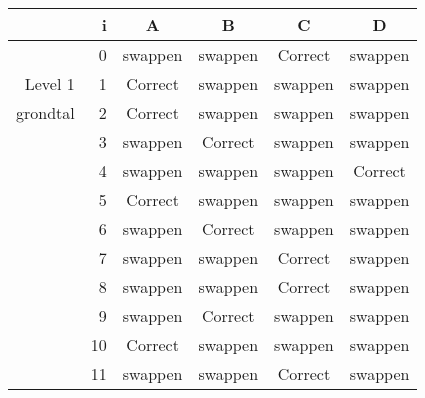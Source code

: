 \begin{tabular}{ rr| c|c|c|c}\hline\hline
     & i & \textbf{A} & \textbf{B} & \textbf{C} & \textbf{D}\\\hline

&0&swappen&swappen&Correct\cellcolor[gray]{0.6}&swappen\\
Level 1 & 1&Correct\cellcolor[gray]{0.6}&swappen&swappen&swappen\\
grondtal &2&Correct\cellcolor[gray]{0.6}&swappen&swappen&swappen\\
&3&swappen&Correct\cellcolor[gray]{0.6}&swappen&swappen\\
&4&swappen&swappen&swappen&Correct\cellcolor[gray]{0.6}\\
&5&Correct\cellcolor[gray]{0.6}&swappen&swappen&swappen\\
&6&swappen&Correct\cellcolor[gray]{0.6}&swappen&swappen\\
&7&swappen&swappen&Correct\cellcolor[gray]{0.6}&swappen\\
&8&swappen&swappen&Correct\cellcolor[gray]{0.6}&swappen\\
&9&swappen&Correct\cellcolor[gray]{0.6}&swappen&swappen\\
&10&Correct\cellcolor[gray]{0.6}&swappen&swappen&swappen\\
&11&swappen&swappen&Correct\cellcolor[gray]{0.6}&swappen\\
\hline\end{tabular}\par\ \newline

